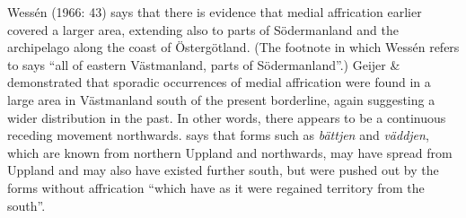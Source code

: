 \begin{styleBodytextC}
Wessén (1966: 43) says that there is evidence that medial affrication earlier covered a larger area, extending also to parts of Södermanland and the archipelago along the coast of Östergötland. (The footnote in \citet[36]{Hesselman1905} which Wessén refers to says “all of eastern Västmanland, parts of Södermanland”.) Geijer \& \citet{Holmkvist1930} demonstrated that sporadic occurrences of medial affrication were found in a large area in Västmanland south of the present borderline, again suggesting a wider distribution in the past. In other words, there appears to be a continuous receding movement northwards. \citet[80]{Reinhammar2005} says that forms such as \textit{bättjen} and \textit{väddjen}, which are known from northern Uppland and northwards, may have spread from Uppland and may also have existed further south, but were pushed out by the forms without affrication “which have as it were regained territory from the south”.

\end{styleBodytextC}

